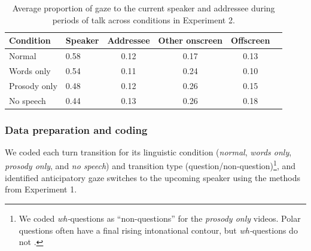 \documentclass[authoryear, 12pt]{elsarticle}
\begin{document}
\linespread{1}
\begin{table}
\begin{center}
  \begin{tabular}{llcccc}
    \hline
    Condition & Speaker & Addressee & Other onscreen & Offscreen\\ 
    \hline
    Normal 			& 0.58 & 0.12 & 0.17 & 0.13 \\ 
    Words only 		& 0.54 & 0.11 & 0.24 & 0.10 \\ 
    Prosody only 	& 0.48 & 0.12 & 0.26 & 0.15 \\ 
    No speech 		& 0.44 & 0.13 & 0.26 & 0.18 \\
    \hline
  \end{tabular}
\end{center}
  \caption{Average proportion of gaze to the current speaker and addressee during periods of talk across conditions in Experiment 2.}
\label{tab:look_e2b}
\end{table}


\subsubsection*{Data preparation and coding}
We coded each turn transition for its linguistic condition (\textit{normal}, \textit{words only}, \textit{prosody only}, and \textit{no speech}) and transition type (question/non-question)\footnote{We coded \textit{wh-}questions as ``non-questions'' for the \textit{prosody only} videos. Polar questions often have a final rising intonational contour, but \textit{wh-}questions do not  \citep{hedberg2010}.}, and identified anticipatory gaze switches to the upcoming speaker using the methods from Experiment 1.
\end{document}
